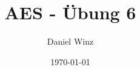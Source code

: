 \documentclass[a4,paper,fleqn]{article}
\title{AES - Übung 6}
\date{\today}
\author{Daniel Winz}
\begin{document}
\maketitle
\vfill
\tableofcontents
\vfill
\clearpage


\clearpage
\begin{appendix}

\end{appendix}
\end{document}
